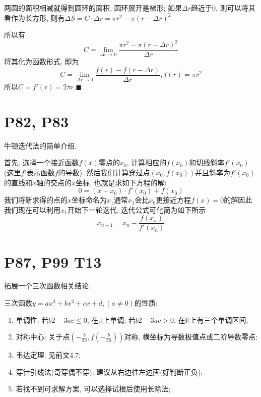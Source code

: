 \documentclass{book}
\begin{document}
    两圆的面积相减就得到圆环的面积, 圆环展开是梯形; 如果$\Delta r$趋近于0, 则可以将其看作为长方形, 则有$\Delta S=C\cdot \Delta r=\pi r^2-\pi \left( r-\Delta r \right)^2$

    所以有$$C=\lim_{\Delta r \to 0} \frac{\pi r^2-\pi \left ( r-\Delta r \right )^2 }{\Delta r} $$
    将其化为函数形式, 即为$$C=\lim_{\Delta r \to 0} \frac{f(r)-f(r-\Delta r) }{\Delta r} ,f(r)=\pi r^2$$
    所以$C=f'(r)=2\pi r .\blacksquare$

    \section{\textcolor[rgb]{0.11,0.65,0.52}{P82, P83}}
    \textcolor[rgb]{0.38,0.11,0.2}{牛顿迭代法}的简单介绍.\cite{Newton}

    首先, 选择一个接近函数${\displaystyle f(x)}$零点的${\displaystyle x_{0}}$, 计算相应的${\displaystyle f(x_{0})}$和切线斜率${\displaystyle f'(x_{0})}$(这里${\displaystyle f'}$表示函数${\displaystyle f}$的导数). 然后我们计算穿过点${\displaystyle (x_{0},f(x_{0}))}$并且斜率为${\displaystyle f'(x_{0})}$的直线和${\displaystyle x}$轴的交点的${\displaystyle x}$坐标, 也就是求如下方程的解:$${\displaystyle 0=(x-x_{0})\cdot f'(x_{0})+f(x_{0})}$$
    我们将新求得的点的${\displaystyle x}$坐标命名为${\displaystyle x_{1}}$通常${\displaystyle x_{1}}$会比${\displaystyle x_{0}}$更接近方程${\displaystyle f(x)=0}$的解因此我们现在可以利用${\displaystyle x_{1}}$开始下一轮迭代. 迭代公式可化简为如下所示$${\displaystyle x_{n+1}=x_{n}-{\frac {f(x_{n})}{f'(x_{n})}}}$$

    \section{\textcolor[rgb]{0.11,0.65,0.52}{P87, P99 T13}}
    
    拓展一个\textcolor[rgb]{0.38,0.11,0.2}{三次函数}相关结论.

    三次函数$\displaystyle y=ax^3+bx^2+cx+d,(a\neq 0)$的性质:
    \begin{enumerate}
        \item 单调性: 若$b2-3ac\le 0$, 在$\mathbb{R}$上单调; 若$b2-3ac> 0$, 在$\mathbb{R}$上有三个单调区间;
        \item 对称中心: 关于点$\displaystyle \left( -\frac{b}{3a},f\left( -\frac{b}{3a} \right) \right)$对称, \textcolor[rgb]{0.75,0.17,0.22}{横坐标为导数极值点或二阶导数零点};
        \item 韦达定理: 见前文4.7;
        \item 穿针引线法(奇穿偶不穿): 建议从右边往左边画(好判断正负);
        \item 若找不到可求解方案, 可以选择试根后使用长除法;
    \end{enumerate}
\end{document}
